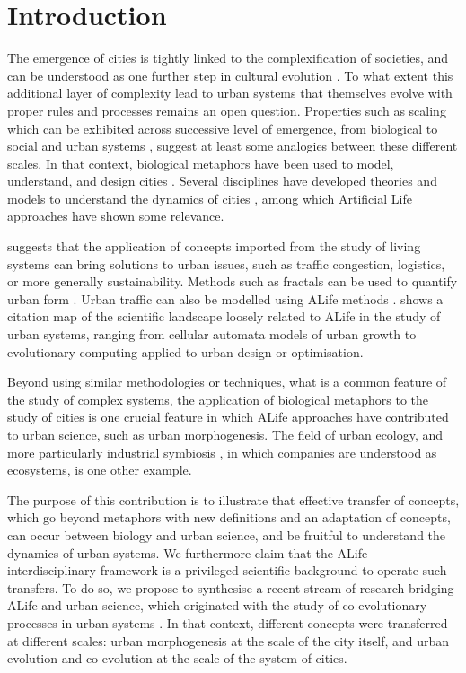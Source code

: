 \documentclass[letterpaper]{article}
\begin{document}
\section{Introduction}

The emergence of cities is tightly linked to the complexification of societies, and can be understood as one further step in cultural evolution \citep{sjoberg1965origin}. To what extent this additional layer of complexity lead to urban systems that themselves evolve with proper rules and processes remains an open question. Properties such as scaling which can be exhibited across successive level of emergence, from biological to social and urban systems \citep{youn2018scaling}, suggest at least some analogies between these different scales. In that context, biological metaphors have been used to model, understand, and design cities \citep{batty2009centenary}. Several disciplines have developed theories and models to understand the dynamics of cities \citep{pumain2020conclusion}, among which Artificial Life approaches have shown some relevance.

\cite{gershenson2013living} suggests that the application of concepts imported from the study of living systems can bring solutions to urban issues, such as traffic congestion, logistics, or more generally sustainability. Methods such as fractals can be used to quantify urban form \citep{chen2010modeling}. Urban traffic can also be modelled using ALife methods \citep{yoshioka2017macroscopic}. \cite{raimbault2020cities} shows a citation map of the scientific landscape loosely related to ALife in the study of urban systems, ranging from cellular automata models of urban growth to evolutionary computing applied to urban design or optimisation.


Beyond using similar methodologies or techniques, what is a common feature of the study of complex systems, the application of biological metaphors to the study of cities is one crucial feature in which ALife approaches have contributed to urban science, such as urban morphogenesis. The field of urban ecology, and more particularly industrial symbiosis \citep{chertow2007uncovering}, in which companies are understood as ecosystems, is one other example.

The purpose of this contribution is to illustrate that effective transfer of concepts, which go beyond metaphors with new definitions and an adaptation of concepts, can occur between biology and urban science, and be fruitful to understand the dynamics of urban systems. We furthermore claim that the ALife interdisciplinary framework is a privileged scientific background to operate such transfers. To do so, we propose to synthesise a recent stream of research bridging ALife and urban science, which originated with the study of co-evolutionary processes in urban systems \citep{raimbault2018caracterisation}. In that context, different concepts were transferred at different scales: urban morphogenesis at the scale of the city itself, and urban evolution and co-evolution at the scale of the system of cities.
\end{document}
